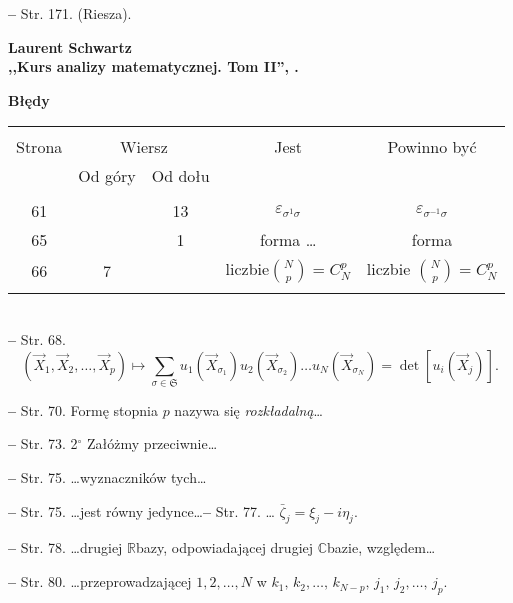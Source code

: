 \documentclass[a4paper]{article}
\newcommand{\s}{\sigma}
\newcommand{\veps}{\varepsilon}
\newcommand{\tb}{\textbf}
\newcommand{\noi}{\noindent}
\newcommand{\start}{\noi \tb{--} {}}
\newcommand{\Center}[1]{\begin{center} #1 \end{center}}
\newcommand{\CenterTB}[1]{\Center{\tb{#1}}}
\newcommand{\Work}[1]{ \begin{center} {\large \tb{#1}} \end{center} }
\begin{document}
\start Str. 171. \large{(Riesza)}.



\newpage



\Work{
  Laurent Schwartz \\
  ,,Kurs analizy matematycznej. Tom II'', \cite{Sch80}.}




\CenterTB{Błędy}
\begin{center}
  \begin{tabular}{|c|c|c|c|c|}
    \hline
    & \multicolumn{2}{c|}{} & & \\
    Strona & \multicolumn{2}{c|}{Wiersz}& Jest & Powinno być \\ \cline{2-3}
    & Od góry & Od dołu &  &  \\ \hline
    & & & & \\
    61 & & 13 & $\veps_{ \s^{ 1 } \s }$ & $\veps_{ \s^{ -1 } \s }$ \\
    65 & & 1 & forma \ldots & forma \\
    66 & 7 & & liczbie${ N\choose p } =  C^{ p }_{ N } $
           & liczbie ${ N\choose p } =  C^{ p }_{ N } $ \\
    & & & & \\ \hline
  \end{tabular}
\end{center}
\noi \\
\start Str. 68.
$$( \vec{ X }_{ 1 }, \vec{ X }_{ 2 }, \ldots, \vec{ X }_{ p })
\mapsto \sum_{\sigma \in \mathfrak{ S } } u_{ 1 }( \vec{ X }_{
  \sigma_{ 1 } } ) u_{ 2 }( \vec{ X }_{ \sigma_{ 2 } } ) \ldots u_{ N
}( \vec{ X }_{ \sigma_{ N } } ) = \det[ u_{ i }( \vec{ X }_{ j } ) ]
\textrm{.}$$

\start Str. 70. Formę stopnia $p$ nazywa się \emph{rozkładalną}\ldots

\start Str. 73. 2$^{\circ}$ Załóżmy przeciwnie\ldots

\start Str. 75. \ldots wyznaczników tych\ldots

\start Str. 75. \ldots jest równy jedynce\ldots \start Str. 77. \ldots
$\bar{ \zeta }_{ j } = \xi_{ j } - i \eta_{ j }$.

\start Str. 78. \ldots drugiej $\mathbb{R}$\dywiz bazy, odpowiadającej
drugiej $\mathbb{C}$\dywiz bazie, względem\ldots

\start Str. 80. \ldots przeprowadzającej $1, 2, \ldots, N$ w
$k_{ 1 }, \, k_{ 2 }, \ldots, \, k_{ N - p }, \, j_{ 1 }, \, j_{ 2 },
\ldots, \, j_{ p }$.
\end{document}
